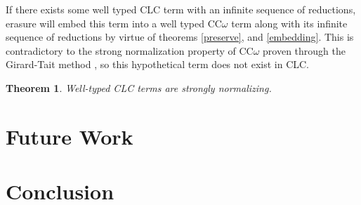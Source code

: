 \documentclass{article}
\newtheorem{theorem}{Theorem}[section]
\theoremstyle{definition}
\begin{document}
  If there exists some well typed CLC term with an infinite sequence of reductions, erasure will embed this term into a well typed CC$\omega$ term along with its infinite sequence of reductions by virtue of theorems \ref{preserve}, and \ref{embedding}. This is contradictory to the strong normalization property of CC$\omega$ proven through the Girard-Tait method \cite{ecc}, so this hypothetical term does not exist in CLC.

  \begin{theorem}
    Well-typed CLC terms are strongly normalizing.
  \end{theorem}

  \section{Future Work}
  \section{Conclusion}



\end{document}
